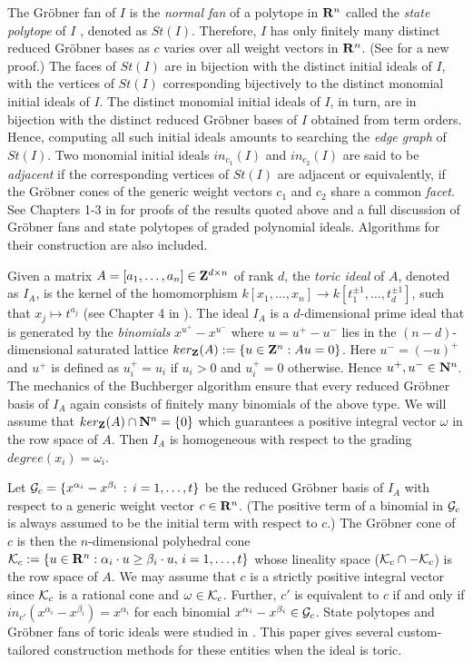\documentclass[11pt]{article}
\begin{document}
The Gr\"obner fan of $I$ is the {\em normal fan} of a polytope in 
${\bf R}^n$ called the {\em state polytope} of $I$ \cite{BM}, denoted
as $St(I)$. Therefore, $I$ has only  
finitely many distinct reduced Gr\"obner bases as $c$ varies over 
all weight vectors in ${\bf R}^n$. (See \cite{Mac} for a new proof.)
The faces of $St(I)$ are  
in bijection with the distinct initial ideals of $I$, with the 
vertices of $St(I)$ corresponding bijectively to the distinct monomial
initial ideals of $I$. The distinct monomial initial ideals of $I$, in turn, 
are in bijection with the distinct reduced Gr\"obner bases of $I$
obtained from term orders. Hence,
computing all such initial ideals amounts to searching the {\em edge graph}
of $St(I)$. Two monomial initial ideals $in_{c_1}(I)$ and
$in_{c_2}(I)$ are said to be {\em adjacent} if 
the corresponding vertices of $St(I)$ are adjacent or equivalently, if
the Gr\"obner cones of the generic weight vectors $c_1$ and $c_2$ share a
common {\em facet}. See  
Chapters 1-3 in \cite{Stu} for proofs of the results quoted above 
and a full discussion of Gr\"obner fans and state polytopes of graded
polynomial ideals. Algorithms for their construction are also included.

Given a matrix $A = [a_1, \ldots, a_n] \in {\bf Z}^{d \times n}$ of
rank $d$, the {\em toric ideal} of $A$, denoted as $I_A$, is the
kernel of the homomorphism $k[x_1,\ldots,x_n]
\rightarrow k[t_1^{\pm 1}, \ldots, t_d^{\pm 1}]$, such that $x_j
\mapsto t^{a_j}$ (see Chapter 4 in \cite{Stu}). The ideal $I_A$ is a 
$d$-dimensional prime ideal that is 
generated by the {\em binomials} $x^{u^+} - x^{u^-}$ where $u = u^+ -
u^-$ lies in the $(n-d)$-dimensional saturated lattice $ker_{\bf Z}(A):=
\{ u \in {\bf Z}^n : Au = 0 \}$. Here $u^- = (-u)^+$ and $u^+$ is
defined as $u^+_i = u_i$ if $u_i > 0$ and $u^+_i = 0$ otherwise. Hence
$u^+, u^- \in {\bf N}^n$. The mechanics of the Buchberger algorithm ensure 
that every reduced Gr\"obner basis of $I_A$ again consists of finitely
many binomials of the above type. We will assume that $ker_{\bf Z}(A)
\cap {\bf N}^n  = \{0\}$ which guarantees a positive integral vector
$\omega$ in the row space of $A$. Then $I_A$ is homogeneous
with respect to the grading $degree(x_i) = \omega_i$.

Let ${\cal G}_c = \{x^{\alpha_i} -
x^{\beta_i} \, : \, i = 1, \ldots, t \}$ be the reduced Gr\"obner
basis of $I_A$ with respect to a generic weight vector $c \in {\bf
R}^n$. (The positive term of a binomial in ${\cal G}_c$ is always
assumed to be the initial term with respect to $c$.) The Gr\"obner
cone of $c$ is then the $n$-dimensional polyhedral cone 
$ {\cal K}_c := \{ u \in {\bf R}^n : \alpha_i \cdot u \geq \beta_i
\cdot u, \, i = 1, \ldots, t \}$
whose lineality space (${\cal K}_c \cap -{\cal K}_c$)
is the row space of $A$. We may assume that $c$ is a strictly positive
integral vector since 
${\cal K}_c$ is a rational cone and $\omega \in {\cal K}_c$. Further,
$c'$ is equivalent to $c$ if and only if
$in_{c'}(x^{\alpha_i} - x^{\beta_i}) = x^{\alpha_i}$ for each binomial
$x^{\alpha_i} - x^{\beta_i} \in {\cal G}_c$. State polytopes and 
Gr\"obner fans of toric ideals were studied in \cite{ST}. This paper
gives several custom-tailored construction methods for these entities
when the ideal is toric. 
\end{document}
